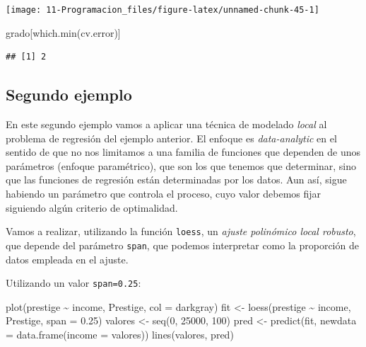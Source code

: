 \documentclass[
]{book}
\newenvironment{Shaded}{\begin{snugshade}}{\end{snugshade}}
\newcommand{\AttributeTok}[1]{\textcolor[rgb]{0.77,0.63,0.00}{#1}}
\newcommand{\DecValTok}[1]{\textcolor[rgb]{0.00,0.00,0.81}{#1}}
\newcommand{\FloatTok}[1]{\textcolor[rgb]{0.00,0.00,0.81}{#1}}
\newcommand{\FunctionTok}[1]{\textcolor[rgb]{0.00,0.00,0.00}{#1}}
\newcommand{\NormalTok}[1]{#1}
\newcommand{\OtherTok}[1]{\textcolor[rgb]{0.56,0.35,0.01}{#1}}
\newcommand{\SpecialCharTok}[1]{\textcolor[rgb]{0.00,0.00,0.00}{#1}}
\newcommand{\StringTok}[1]{\textcolor[rgb]{0.31,0.60,0.02}{#1}}
\theoremstyle{break}
\theoremstyle{nonumberplain}
\begin{document}
\begin{center}\texttt{[image: 11-Programacion\_files/figure-latex/unnamed-chunk-45-1]} \end{center}

\begin{Shaded}
\begin{Highlighting}[]
\NormalTok{grado[}\FunctionTok{which.min}\NormalTok{(cv.error)]}
\end{Highlighting}
\end{Shaded}

\begin{verbatim}
## [1] 2
\end{verbatim}

\hypertarget{segundo-ejemplo}{%
\subsection{Segundo ejemplo}\label{segundo-ejemplo}}

En este segundo ejemplo vamos a aplicar una técnica de modelado \emph{local} al problema de
regresión del ejemplo anterior.
El enfoque es \emph{data-analytic} en el sentido de que no nos limitamos a una
familia de funciones que dependen de unos parámetros (enfoque paramétrico),
que son los que tenemos que determinar, sino que las funciones de
regresión están determinadas por los datos. Aun así, sigue habiendo un
parámetro que controla el proceso, cuyo valor debemos fijar siguiendo
algún criterio de optimalidad.

Vamos a realizar, utilizando la función \texttt{loess}, un \emph{ajuste polinómico local
robusto}, que depende del parámetro \texttt{span}, que podemos interpretar como la
proporción de datos empleada en el ajuste.

Utilizando un valor \texttt{span=0.25}:

\begin{Shaded}
\begin{Highlighting}[]
\FunctionTok{plot}\NormalTok{(prestige }\SpecialCharTok{\textasciitilde{}}\NormalTok{ income, Prestige, }\AttributeTok{col =} \StringTok{\textquotesingle{}darkgray\textquotesingle{}}\NormalTok{)}
\NormalTok{fit }\OtherTok{\textless{}{-}} \FunctionTok{loess}\NormalTok{(prestige }\SpecialCharTok{\textasciitilde{}}\NormalTok{ income, Prestige, }\AttributeTok{span =} \FloatTok{0.25}\NormalTok{)}
\NormalTok{valores }\OtherTok{\textless{}{-}} \FunctionTok{seq}\NormalTok{(}\DecValTok{0}\NormalTok{, }\DecValTok{25000}\NormalTok{, }\DecValTok{100}\NormalTok{)}
\NormalTok{pred }\OtherTok{\textless{}{-}} \FunctionTok{predict}\NormalTok{(fit, }\AttributeTok{newdata =} \FunctionTok{data.frame}\NormalTok{(}\AttributeTok{income =}\NormalTok{ valores))}
\FunctionTok{lines}\NormalTok{(valores, pred)}
\end{Highlighting}
\end{Shaded}
\end{document}
